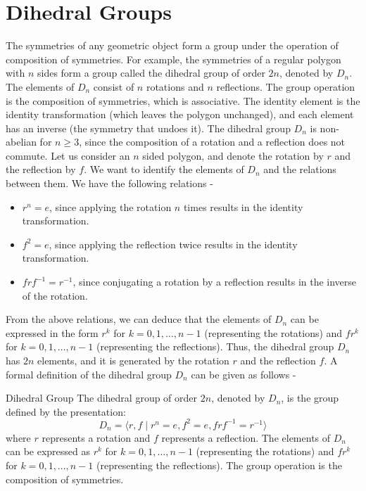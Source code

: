 \documentclass[openany]{book}
\begin{document}
\section{Dihedral Groups}
The symmetries of any geometric object form a group under the operation of composition of symmetries. For example, the symmetries of a regular polygon with \( n \) sides form a group called the dihedral group of order \( 2n \), denoted by \( D_n \). The elements of \( D_n \) consist of \( n \) rotations and \( n \) reflections. The group operation is the composition of symmetries, which is associative. The identity element is the identity transformation (which leaves the polygon unchanged), and each element has an inverse (the symmetry that undoes it). The dihedral group \( D_n \) is non-abelian for \( n \geq 3 \), since the composition of a rotation and a reflection does not commute. Let us consider an $n$ sided polygon, and denote the rotation by $r$ and the reflection by $f$. We want to identify the elements of $D_n$ and the relations between them. We have the following relations -
\begin{itemize}
    \item $r^n = e$, since applying the rotation $n$ times results in the identity transformation.
    \item $f^2 = e$, since applying the reflection twice results in the identity transformation.
    \item $f r f^{-1} = r^{-1}$, since conjugating a rotation by a reflection results in the inverse of the rotation.
\end{itemize}
From the above relations, we can deduce that the elements of $D_n$ can be expressed in the form $r^k$ for $k = 0, 1, \ldots, n-1$ (representing the rotations) and $f r^k$ for $k = 0, 1, \ldots, n-1$ (representing the reflections). Thus, the dihedral group $D_n$ has $2n$ elements, and it is generated by the rotation $r$ and the reflection $f$. 
A formal definition of the dihedral group $D_n$ can be given as follows -
\begin{mydefinition}{Dihedral Group}
    The dihedral group of order \( 2n \), denoted by \( D_n \), is the group defined by the presentation:
    \[
    D_n = \langle r, f \mid r^n = e, f^2 = e, f r f^{-1} = r^{-1} \rangle
    \]
    where \( r \) represents a rotation and \( f \) represents a reflection. The elements of \( D_n \) can be expressed as \( r^k \) for \( k = 0, 1, \ldots, n-1 \) (representing the rotations) and \( f r^k \) for \( k = 0, 1, \ldots, n-1 \) (representing the reflections). The group operation is the composition of symmetries.
\end{mydefinition}
\end{document}
